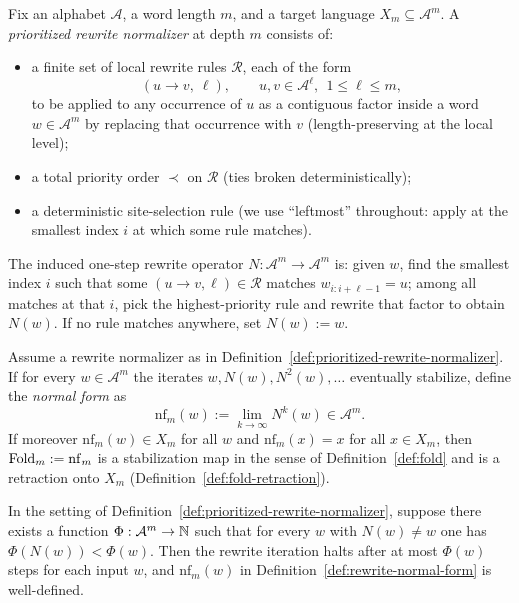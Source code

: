 \begin{definition}\label{def:prioritized-rewrite-normalizer}
Fix an alphabet \(\mathcal{A}\), a word length \(m\), and a target language \(X_m\subseteq \mathcal{A}^m\).
A \emph{prioritized rewrite normalizer} at depth \(m\) consists of:
\begin{itemize}[leftmargin=*,itemsep=2pt]
  \item a finite set of local rewrite rules \(\mathcal{R}\), each of the form
  \[
  (u\to v,\ \ell),\qquad u,v\in\mathcal{A}^\ell,\ \ 1\le \ell\le m,
  \]
  to be applied to any occurrence of \(u\) as a contiguous factor inside a word \(w\in\mathcal{A}^m\) by replacing that occurrence with \(v\) (length-preserving at the local level);
  \item a total priority order \(\prec\) on \(\mathcal{R}\) (ties broken deterministically);
  \item a deterministic site-selection rule (we use ``leftmost'' throughout: apply at the smallest index \(i\) at which some rule matches).
\end{itemize}
The induced one-step rewrite operator \(N:\mathcal{A}^m\to\mathcal{A}^m\) is:
given \(w\), find the smallest index \(i\) such that some \((u\to v,\ell)\in\mathcal{R}\) matches \(w_{i:i+\ell-1}=u\); among all matches at that \(i\), pick the highest-priority rule and rewrite that factor to obtain \(N(w)\).
If no rule matches anywhere, set \(N(w):=w\).
\end{definition}

\begin{definition}\label{def:rewrite-normal-form}
Assume a rewrite normalizer as in Definition~\ref{def:prioritized-rewrite-normalizer}.
If for every \(w\in\mathcal{A}^m\) the iterates \(w, N(w), N^2(w),\dots\) eventually stabilize, define the \emph{normal form} as
\[
\mathrm{nf}_m(w):=\lim_{k\to\infty} N^k(w)\in\mathcal{A}^m.
\]
If moreover \(\mathrm{nf}_m(w)\in X_m\) for all \(w\) and \(\mathrm{nf}_m(x)=x\) for all \(x\in X_m\), then \(\mathrm{Fold}_m:=\mathrm{nf}_m\) is a stabilization map in the sense of Definition~\ref{def:fold} and is a retraction onto \(X_m\) (Definition~\ref{def:fold-retraction}).
\end{definition}

\begin{proposition}\label{prop:rewrite-termination}
In the setting of Definition~\ref{def:prioritized-rewrite-normalizer}, suppose there exists a function \(\Phi:\mathcal{A}^m\to \mathbb{N}\) such that for every \(w\) with \(N(w)\neq w\) one has \(\Phi(N(w))<\Phi(w)\).
Then the rewrite iteration halts after at most \(\Phi(w)\) steps for each input \(w\), and \(\mathrm{nf}_m(w)\) in Definition~\ref{def:rewrite-normal-form} is well-defined.
\end{proposition}

